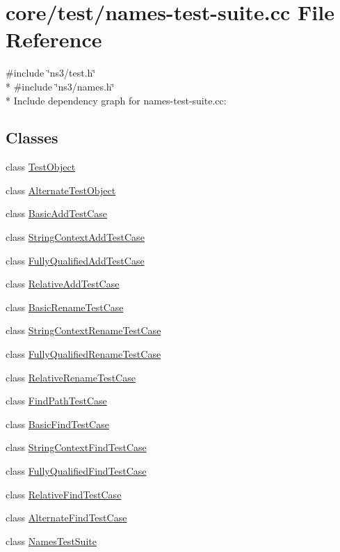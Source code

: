 \hypertarget{names-test-suite_8cc}{}\section{core/test/names-\/test-\/suite.cc File Reference}
\label{names-test-suite_8cc}
{\ttfamily \#include \char`\"{}ns3/test.\+h\char`\"{}}\\*
{\ttfamily \#include \char`\"{}ns3/names.\+h\char`\"{}}\\*
Include dependency graph for names-\/test-\/suite.cc\+:
\subsection*{Classes}
\begin{DoxyCompactItemize}
\item 
class \hyperlink{classTestObject}{Test\+Object}
\item 
class \hyperlink{classAlternateTestObject}{Alternate\+Test\+Object}
\item 
class \hyperlink{classBasicAddTestCase}{Basic\+Add\+Test\+Case}
\item 
class \hyperlink{classStringContextAddTestCase}{String\+Context\+Add\+Test\+Case}
\item 
class \hyperlink{classFullyQualifiedAddTestCase}{Fully\+Qualified\+Add\+Test\+Case}
\item 
class \hyperlink{classRelativeAddTestCase}{Relative\+Add\+Test\+Case}
\item 
class \hyperlink{classBasicRenameTestCase}{Basic\+Rename\+Test\+Case}
\item 
class \hyperlink{classStringContextRenameTestCase}{String\+Context\+Rename\+Test\+Case}
\item 
class \hyperlink{classFullyQualifiedRenameTestCase}{Fully\+Qualified\+Rename\+Test\+Case}
\item 
class \hyperlink{classRelativeRenameTestCase}{Relative\+Rename\+Test\+Case}
\item 
class \hyperlink{classFindPathTestCase}{Find\+Path\+Test\+Case}
\item 
class \hyperlink{classBasicFindTestCase}{Basic\+Find\+Test\+Case}
\item 
class \hyperlink{classStringContextFindTestCase}{String\+Context\+Find\+Test\+Case}
\item 
class \hyperlink{classFullyQualifiedFindTestCase}{Fully\+Qualified\+Find\+Test\+Case}
\item 
class \hyperlink{classRelativeFindTestCase}{Relative\+Find\+Test\+Case}
\item 
class \hyperlink{classAlternateFindTestCase}{Alternate\+Find\+Test\+Case}
\item 
class \hyperlink{classNamesTestSuite}{Names\+Test\+Suite}
\end{DoxyCompactItemize}
